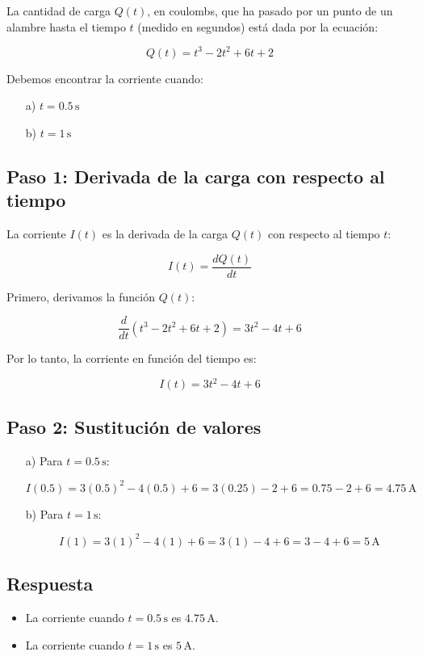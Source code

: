 \documentclass[11pt,letterpaper]{article}
\begin{document}
La cantidad de carga \( Q(t) \), en coulombs, que ha pasado por un punto de un alambre hasta el tiempo \( t \) (medido en segundos) está dada por la ecuación:

\[
Q(t) = t^3 - 2t^2 + 6t + 2
\]

Debemos encontrar la corriente cuando:

\begin{itemize}
    \item[a)] \( t = 0.5 \, \text{s} \)
    \item[b)] \( t = 1 \, \text{s} \)
\end{itemize}

\subsection*{Paso 1: Derivada de la carga con respecto al tiempo}

La corriente \( I(t) \) es la derivada de la carga \( Q(t) \) con respecto al tiempo \( t \):

\[
I(t) = \frac{dQ(t)}{dt}
\]

Primero, derivamos la función \( Q(t) \):

\[
\frac{d}{dt} \left( t^3 - 2t^2 + 6t + 2 \right) = 3t^2 - 4t + 6
\]

Por lo tanto, la corriente en función del tiempo es:

\[
I(t) = 3t^2 - 4t + 6
\]

\subsection*{Paso 2: Sustitución de valores}

\begin{itemize}
    \item[a)] Para \( t = 0.5 \, \text{s} \):

    \[
    I(0.5) = 3(0.5)^2 - 4(0.5) + 6 = 3(0.25) - 2 + 6 = 0.75 - 2 + 6 = 4.75 \, \text{A}
    \]

    \item[b)] Para \( t = 1 \, \text{s} \):

    \[
    I(1) = 3(1)^2 - 4(1) + 6 = 3(1) - 4 + 6 = 3 - 4 + 6 = 5 \, \text{A}
    \]
\end{itemize}

\subsection*{Respuesta}

\begin{itemize}
    \item La corriente cuando \( t = 0.5 \, \text{s} \) es \( 4.75 \, \text{A} \).
    \item La corriente cuando \( t = 1 \, \text{s} \) es \( 5 \, \text{A} \).
\end{itemize}
\end{document}
